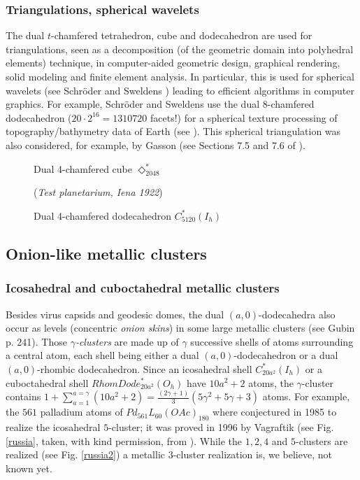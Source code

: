 \newpage
\subsubsection{Triangulations, spherical wavelets}
The dual $t$-chamfered tetrahedron, cube and dodecahedron are used
for triangulations, seen as a decomposition (of the geometric
domain into polyhedral elements) technique, in computer-aided geometric design, graphical
rendering, solid modeling and finite element analysis. In particular, this is 
used for spherical wavelets (see 
{\sc Schr\"oder and Sweldens} \cite{ss94,ss94bis}) leading to efficient algorithms in computer graphics.
For example, {\sc Schr\"oder and Sweldens} use the dual $8$-chamfered dodecahedron ($20\cdot 2^{16}=1310720$ facets!) for a
spherical texture
processing of topography/bathymetry data of Earth (see \cite{ss94bis}).
This spherical triangulation was also considered, for example,
by {\sc Gasson} (see Sections 7.5 and 7.6 of \cite{gasson}).

\begin{figure}[hbt]
\begin{center}
\caption{Dual 4-chamfered cube $\Diamond^*_{2048}$}\label{heche3octa}
\end{center}
\begin{center}
\caption{Dual 4-chamfered dodecahedron $C_{5120}^*(I_h)$}\label{heche4dode}

({\it Test planetarium, Iena 1922})
\end{center}
\end{figure}

\newpage
\subsection{Onion-like metallic clusters}\label{cluster}
\subsubsection{Icosahedral and cuboctahedral metallic clusters}
Besides virus capsids and geodesic domes,
the dual $(a,0)$-dodecahedra also occur as levels (concentric {\it onion skins})
in some large metallic clusters (see {\sc Gubin} \cite{gubin} p. 241).
Those {\it $\gamma$-clusters} are made up of $\gamma$ successive shells of atoms surrounding
a central atom, each shell being either a dual $(a,0)$-dodecahedron or a dual $(a,0)$-rhombic 
dodecahedron.
Since an icosahedral shell $C^*_{20a^2}(I_h)$ or a cuboctahedral shell $RhomDode^*_{20a^2}(O_h)$ 
have $10a^2+2$ atoms, the $\gamma$-cluster contains
$1+\sum_{a=1}^{a=\gamma}(10a^2+2)=\frac{(2\gamma+1)}{3}(5\gamma^2+5\gamma+3)$
atoms.
For example, the $561$ palladium atoms of $Pd_{561} L_{60}(OAc)_{180}$
where conjectured in 1985 to realize the icosahedral $5$-cluster; it was proved in 1996 by
{\sc Vagraftik} \cite{vag96} (see Fig. \ref{russia}, taken, with kind permission, 
from \cite{gubin}).
While the $1,2,4$ and $5$-clusters are realized (see Fig. \ref{russia2}) a metallic $3$-cluster
realization is, we believe, not known yet.

